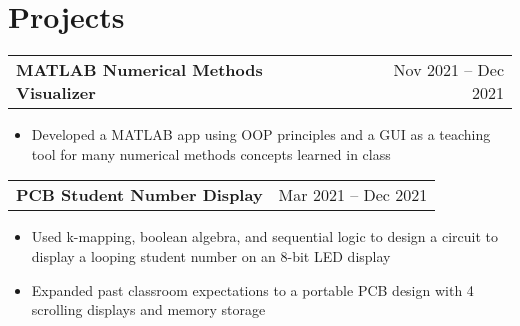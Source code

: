 \documentclass[a4paper,10pt]{article}
\begin{document}
\section{Projects}
\begin{tabularx}{\linewidth}{@{}X r@{}}
\begin{minipage}[t]{\linewidth}
  \textbf{MATLAB Numerical Methods Visualizer}
\end{minipage}
&     Nov 2021 -- Dec 2021
\\[3.75pt]
\end{tabularx}
\begin{itemize}[nosep,after=\strut, leftmargin=1em, itemsep=3pt,label=--]
  \item Developed a MATLAB app using OOP principles and a GUI as a teaching tool for many numerical methods concepts learned in class
\end{itemize}
\begin{tabularx}{\linewidth}{@{}X r@{}}
\begin{minipage}[t]{\linewidth}
  \textbf{PCB Student Number Display}
\end{minipage}
&     Mar 2021 -- Dec 2021
\\[3.75pt]
\end{tabularx}
\begin{itemize}[nosep,after=\strut, leftmargin=1em, itemsep=3pt,label=--]
  \item Used k-mapping, boolean algebra, and sequential logic to design a circuit to display a looping student number on an 8-bit LED display
\item Expanded past classroom expectations to a portable PCB design with 4 scrolling displays and memory storage
\end{itemize}
\end{document}
